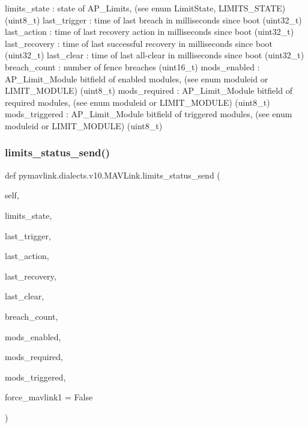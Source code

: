 \begin{DoxyVerb}
\begin{DoxyVerb}
\begin{DoxyVerb}
\begin{DoxyVerb}
\begin{DoxyVerb}
limits_state              : state of AP_Limits, (see enum LimitState, LIMITS_STATE) (uint8_t)
last_trigger              : time of last breach in milliseconds since boot (uint32_t)
last_action               : time of last recovery action in milliseconds since boot (uint32_t)
last_recovery             : time of last successful recovery in milliseconds since boot (uint32_t)
last_clear                : time of last all-clear in milliseconds since boot (uint32_t)
breach_count              : number of fence breaches (uint16_t)
mods_enabled              : AP_Limit_Module bitfield of enabled modules, (see enum moduleid or LIMIT_MODULE) (uint8_t)
mods_required             : AP_Limit_Module bitfield of required modules, (see enum moduleid or LIMIT_MODULE) (uint8_t)
mods_triggered            : AP_Limit_Module bitfield of triggered modules, (see enum moduleid or LIMIT_MODULE) (uint8_t)\end{DoxyVerb}
 \mbox{\label{classpymavlink_1_1dialects_1_1v10_1_1MAVLink_a994f9dc808c8993e2fd827e764b181a1}} 
\subsubsection{\texorpdfstring{limits\+\_\+status\+\_\+send()}{limits\_status\_send()}}
{\footnotesize\ttfamily def pymavlink.\+dialects.\+v10.\+M\+A\+V\+Link.\+limits\+\_\+status\+\_\+send (\begin{DoxyParamCaption}\item[{}]{self,  }\item[{}]{limits\+\_\+state,  }\item[{}]{last\+\_\+trigger,  }\item[{}]{last\+\_\+action,  }\item[{}]{last\+\_\+recovery,  }\item[{}]{last\+\_\+clear,  }\item[{}]{breach\+\_\+count,  }\item[{}]{mods\+\_\+enabled,  }\item[{}]{mods\+\_\+required,  }\item[{}]{mods\+\_\+triggered,  }\item[{}]{force\+\_\+mavlink1 = {\ttfamily False} }\end{DoxyParamCaption})}


\end{DoxyVerb}
\end{DoxyVerb}
\end{DoxyVerb}
\end{DoxyVerb}
